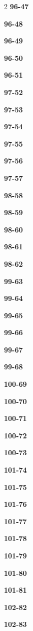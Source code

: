 \documentclass[10pt,a4paper]{article}
\begin{document}
\begin{multicols}{2}
\noindent\textbf{96-47}\ \par
\noindent\textbf{96-48}\ \par
\noindent\textbf{96-49}\ \par
\noindent\textbf{96-50}\ \par
\noindent\textbf{96-51}\ \par
\noindent\textbf{97-52}\ \par
\noindent\textbf{97-53}\ \par
\noindent\textbf{97-54}\ \par
\noindent\textbf{97-55}\ \par
\noindent\textbf{97-56}\ \par
\noindent\textbf{97-57}\ \par
\noindent\textbf{98-58}\ \par
\noindent\textbf{98-59}\ \par
\noindent\textbf{98-60}\ \par
\noindent\textbf{98-61}\ \par
\noindent\textbf{98-62}\ \par
\noindent\textbf{99-63}\ \par
\noindent\textbf{99-64}\ \par
\noindent\textbf{99-65}\ \par
\noindent\textbf{99-66}\ \par
\noindent\textbf{99-67}\ \par
\noindent\textbf{99-68}\ \par
\noindent\textbf{100-69}\ \par
\noindent\textbf{100-70}\ \par
\noindent\textbf{100-71}\ \par
\noindent\textbf{100-72}\ \par
\noindent\textbf{100-73}\ \par
\noindent\textbf{101-74}\ \par
\noindent\textbf{101-75}\ \par
\noindent\textbf{101-76}\ \par
\noindent\textbf{101-77}\ \par
\noindent\textbf{101-78}\ \par
\noindent\textbf{101-79}\ \par
\noindent\textbf{101-80}\ \par
\noindent\textbf{101-81}\ \par
\noindent\textbf{102-82}\ \par
\noindent\textbf{102-83}\ \par

\end{multicols}
\end{document}

